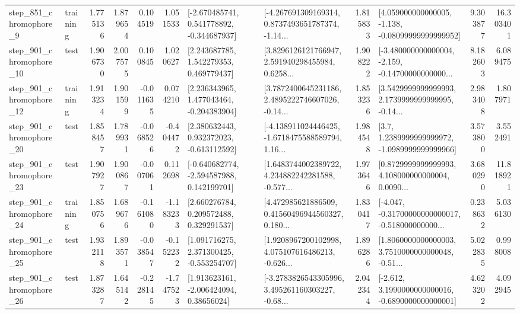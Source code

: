 \begin{tabular}{llrrrrllrlrr}
   step\_851\_chromophore\_9 &  training &      1.775136 &    1.879654 &      0.104519 &  1.051533 &   [-2.670485741, 0.541778892, -0.344687937] &  [-4.267691309169314, 0.8737493651787374, -1.14... &       1.815833 &  [4.059000000000005, -1.138, -0.08099999999999952] &            9.303877 &         16.303401 \\
  step\_901\_chromophore\_10 &      test &      1.906730 &    2.007575 &      0.100845 &  1.020627 &     [2.243687785, 1.542279353, 0.469779437] &  [3.8296126121766947, 2.591940298455984, 0.6258... &       1.908222 &  [-3.480000000000004, -2.159, -0.14700000000000... &            8.182603 &          6.089475 \\
  step\_901\_chromophore\_12 &  training &      1.913234 &    1.901599 &     -0.011635 &  0.074210 &    [2.236343965, 1.477043464, -0.204383904] &  [3.7872400645231186, 2.4895222746607026, -0.14... &       1.853236 &  [3.5429999999999993, 2.1739999999999995, -0.14... &            2.983408 &          1.807971 \\
  step\_901\_chromophore\_20 &      test &      1.858457 &    1.789931 &     -0.068526 & -0.404472 &    [2.380632443, 0.932372023, -0.613112592] &  [-4.138911024446425, -1.6718475588589794, 1.16... &       1.984548 &     [3.7, 1.2389999999999972, -1.0989999999999966] &            3.573800 &          3.552491 \\
  step\_901\_chromophore\_23 &      test &      1.907927 &    1.900867 &     -0.007061 &  0.112698 &   [-0.640682774, -2.594587988, 0.142199701] &  [1.6483744002389722, 4.234882242281588, -0.577... &       1.973646 &  [0.8729999999999993, 4.108000000000004, 0.0090... &            3.680290 &         11.818921 \\
  step\_901\_chromophore\_24 &  training &      1.850756 &    1.689676 &     -0.161080 & -1.183233 &     [2.660276784, 0.209572488, 0.329291537] &  [4.472985621886509, 0.41560496944560327, 0.180... &       1.830417 &  [-4.047, -0.31700000000000017, -0.518000000000... &            0.238632 &          5.036130 \\
  step\_901\_chromophore\_25 &      test &      1.932118 &    1.893571 &     -0.038547 & -0.152232 &    [1.091716275, 2.371300425, -0.553254707] &  [1.9208967200102998, 4.075107616486213, -0.626... &       1.896286 &  [1.8060000000000003, 3.7510000000000048, -0.51... &            5.022835 &          0.998008 \\
  step\_901\_chromophore\_26 &      test &      1.873287 &    1.645142 &     -0.228145 & -1.747523 &     [1.913623161, -2.006424094, 0.38656024] &  [-3.2783826543305996, 3.495261160303227, -0.68... &       2.042344 &  [-2.612, 3.1990000000000016, -0.6890000000000001] &            4.623202 &          4.092945 \\

\end{tabular}
